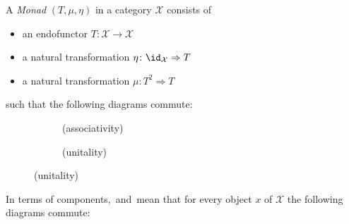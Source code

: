 \begin{definition}[Monad]
A \textit{Monad} $(T,\mu, \eta) $ in a category $\mathcal{X}$ consists of
\begin{itemize}
    \item an endofunctor $T\colon \mathcal{X} \to \mathcal{X}$
    \item a natural transformation $\eta \colon \id_\mathcal{X} \Rightarrow T$ 
    \item a natural transformation $\mu\colon T^2 \Rightarrow T $
\end{itemize}  
such that the following diagrams commute: \\
\begin{figure}[H]
    \centering
    \begin{subfigure}{0.3\textwidth}
        \centering
        \label{dia: associativity}
        \caption*{(associativity)}
    \end{subfigure}
    \hspace{2em}
    \begin{subfigure}{0.3\textwidth}
        \centering
        \label{dia: unitality}
        \caption*{(unitality)}
    \end{subfigure} 
\end{figure}

In terms of components,~ and~ mean that for every object $x$ of $\mathcal{X}$
the following diagrams commute:


\end{definition}

